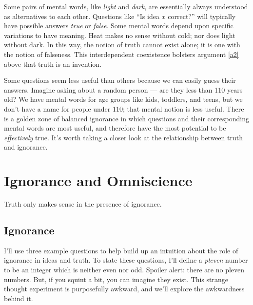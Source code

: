 \documentclass[11pt, oneside]{article}   	%
\begin{document}
Some pairs of mental words, like {\em light} and {\em dark}, are essentially
always understood as alternatives to each other.
Questions like ``Is idea $x$
correct?'' will typically have possible answers {\em true} or {\em false}.
Some mental words depend upon specific variations to have meaning.
Heat makes no sense without cold; nor does light without dark.
In this way, the notion of truth cannot exist alone;
it is one with the notion of falseness. This interdependent
coexistence bolsters argument
\ref{a2} above that truth is an invention.

Some questions seem less useful than others because we can easily guess their
answers. Imagine asking about a random person ---
are they less than 110 years old?
We have mental words for age groups like kids,
toddlers, and teens, but we don't have a name for people under 110;
that mental notion is less useful.
There is a golden zone of balanced ignorance in which questions and their
corresponding mental words are most useful, and therefore have
the most potential to be {\em effectively} true. It's worth taking a closer look
at the relationship between truth and ignorance.


%
%
%
%
%


\section{Ignorance and Omniscience}

Truth only makes sense in the presence of ignorance.

\subsection{Ignorance}

I'll use three example questions
to help build up an intuition about the role of
ignorance in ideas and truth.
To state these questions, I'll define a
{\em pleven} number to be an integer which is neither even nor odd. Spoiler
alert: there are no pleven numbers. But, if you squint a bit, you can imagine
they exist. This strange thought experiment is purposefully awkward, and we'll
explore the awkwardness behind it.
\end{document}

